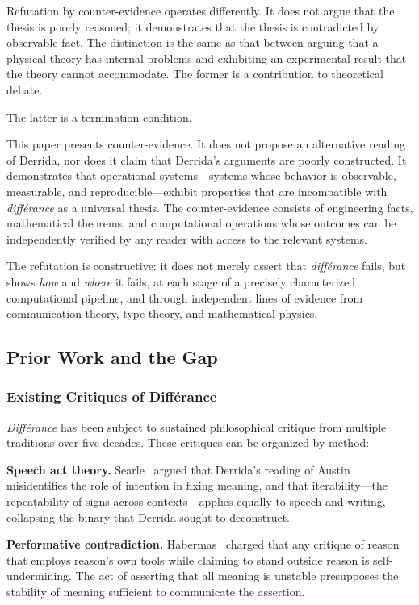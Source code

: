 \documentclass[a4paper,twocolumn,11pt]{article}
\begin{document}
Refutation by counter-evidence operates differently. It does not argue that the thesis is poorly reasoned; it demonstrates that the thesis is contradicted by observable fact. The distinction is the same as that between arguing that a physical theory has internal problems and exhibiting an experimental result that the theory cannot accommodate. The former is a contribution to theoretical debate.

The latter is a termination condition.

This paper presents counter-evidence. It does not propose an alternative reading of Derrida, nor does it claim that Derrida's arguments are poorly constructed. It demonstrates that operational systems---systems whose behavior is observable, measurable, and reproducible---exhibit properties that are incompatible with \emph{diff\'erance} as a universal thesis. The counter-evidence consists of engineering facts, mathematical theorems, and computational operations whose outcomes can be independently verified by any reader with access to the relevant systems.

The refutation is constructive: it does not merely assert that \emph{diff\'erance} fails, but shows \emph{how} and \emph{where} it fails, at each stage of a precisely characterized computational pipeline, and through independent lines of evidence from communication theory, type theory, and mathematical physics.

\subsection{Prior Work and the Gap}
\label{sec:prior-work}

\subsubsection{Existing Critiques of Diff\'erance}

\emph{Diff\'erance} has been subject to sustained philosophical critique from multiple traditions over five decades. These critiques can be organized by method:

\textbf{Speech act theory.} Searle~\cite{Searle1977} argued that Derrida's reading of Austin misidentifies the role of intention in fixing meaning, and that iterability---the repeatability of signs across contexts---applies equally to speech and writing, collapsing the binary that Derrida sought to deconstruct.

\textbf{Performative contradiction.} Habermas~\cite{Habermas1985} charged that any critique of reason that employs reason's own tools while claiming to stand outside reason is self-undermining. The act of asserting that all meaning is unstable presupposes the stability of meaning sufficient to communicate the assertion.
\end{document}
